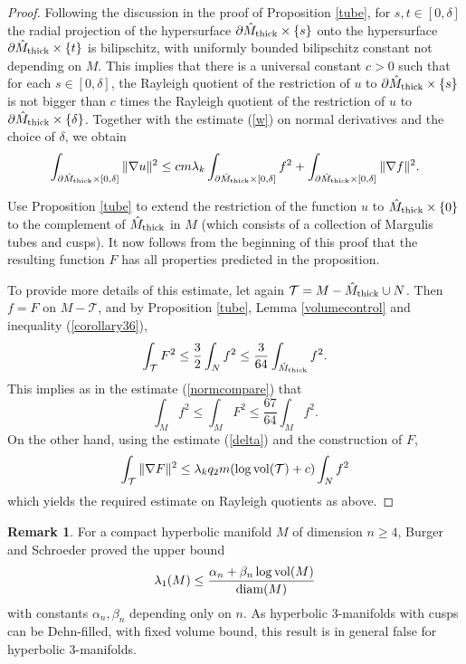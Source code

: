 \documentclass[11pt]{amsart}
\theoremstyle{plain}
\theoremstyle{plain}
\theoremstyle{definition}
\newtheorem{remark}[theorem]{Remark}
\newcommand{\cal}{\mathcal}
\begin{document}
\begin{proof}
Following the discussion in the proof of Proposition \ref{tube}, for 
$s,t\in [0,\delta]$ the radial 
projection of the hypersurface
$\partial \hat M_{\rm thick}\times \{s\}$ onto the 
hypersurface 
$\partial \hat M_{\rm thick}\times \{t\}$ is bilipschitz, with uniformly bounded 
bilipschitz constant not depending on $M$. 
This implies that there is a universal constant
$c>0$ such that for each $s\in [0,\delta]$, 
the Rayleigh quotient
of the restriction of $u$ to
$\partial \hat M_{\rm thick}\times \{s\}$ is not bigger than
$c$ times the Rayleigh quotient of the restriction of $u$ to 
$\partial \hat M_{\rm thick}\times \{\delta\}$.
Together with the estimate (\ref{w})
on normal derivatives and the choice of
$\delta$, we obtain 
\[\int_{\partial \hat M_{\rm thick}\times [0,\delta]}
  \Vert \nabla u\Vert^2
  \leq cm\lambda_k\int_{\partial \hat M_{\rm thick}\times
    [0,\delta]}f^2
  +\int_{\partial \hat M_{\rm thick}\times [0,\delta]}
  \Vert \nabla f\Vert^2.\]


Use Proposition \ref{tube} to 
extend the restriction of the
function $u$ to $\hat M_{\rm thick}\times \{0\}$ to 
the complement of 
$\hat M_{\rm thick}$ in $M$
(which consists of a collection of Margulis tubes and cusps).
It now follows from the beginning of this proof that the
resulting function $F$ has all properties
predicted in
the proposition.

To provide more details of this estimate, let 
again ${\cal T}=M-\hat M_{\rm thick}\cup N$. 
Then $f=F$ on $M-{\cal T}$, and by Proposition \ref{tube},
Lemma \ref{volumecontrol}
and inequality (\ref{corollary36}), 
\begin{equation}\label{estimate12}
  \int_{\cal T}F^2\leq \frac{3}{2}\int_Nf^2\leq
\frac{3}{64}\int_{\hat M_{\rm thick}}f^2. \end{equation}
This implies as in the estimate (\ref{normcompare}) that 
\begin{equation}\label{comparisoncontrol2}
\int_Mf^2\leq \int_MF^2\leq \frac{67}{64}\int_Mf^2.
\end{equation}
On the other hand, using the estimate (\ref{delta})
and the construction of $F$, 
\[\int_{{\cal T}}\Vert \nabla F\Vert^2\leq
  \lambda_kq_2m(\log{\rm vol}({\cal T})+c)\int_{N}f^2\]
which yields the required estimate on Rayleigh quotients as above.
\end{proof}



\begin{remark} For a compact 
hyperbolic manifold $M$ of dimension $n\geq 4$, 
Burger and Schroeder 
\cite{BS87} proved the upper bound
\[\lambda_1(M)\leq \frac{\alpha_n+\beta_n\log{\rm vol}(M)}{{\rm diam}(M)}\]
with constants $\alpha_n,\beta_n$ depending only on $n$.
As hyperbolic $3$-manifolds with cusps can be Dehn-filled, with 
fixed volume bound,  this result is in general false for 
hyperbolic $3$-manifolds.
\end{remark}
\end{document}
